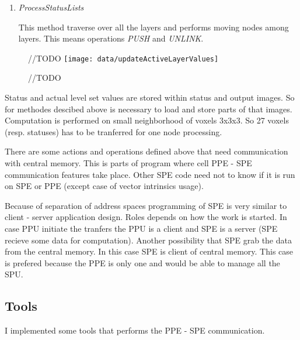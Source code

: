 \begin{enumerate}
\item \emph{ProcessStatusLists}
\par
This method traverse over all the layers and performs moving nodes among layers.
This means operations \emph{PUSH} and \emph{UNLINK}.
\end{enumerate}

\begin{figure}	//TODO
    \centering
    \texttt{[image: data/updateActiveLayerValues]}
    \caption[Diagram of new design components]{//TODO}
    \label{fg:updateActiveLayerValues}
\end{figure}

Status and actual level set values are stored within status and output images.
So for methodes descibed above is necessary to load and store parts of that images.
Computation is performed on small neighborhood of voxels 3x3x3.
So 27 voxels (resp. statuses) has to be tranferred for one node processing.

There are some actions and operations defined above that need communication with central memory.
This is parts of program where cell PPE - SPE communication features take place.
Other SPE code need not to know if it is run on SPE or PPE (except case of vector intrinsics usage).

Because of separation of address spaces programming of SPE is very similar to client - server application design.
Roles depends on how the work is started.
In case PPU initiate the tranfers the PPU is a client and SPE is a server (SPE recieve some data for computation).
Another possibility that SPE grab the data from the central memory.
In this case SPE is client of central memory.
This case is prefered because the PPE is only one and would be able to manage all the SPU.

\subsection{Tools}
I implemented some tools that performs the PPE - SPE communication.

